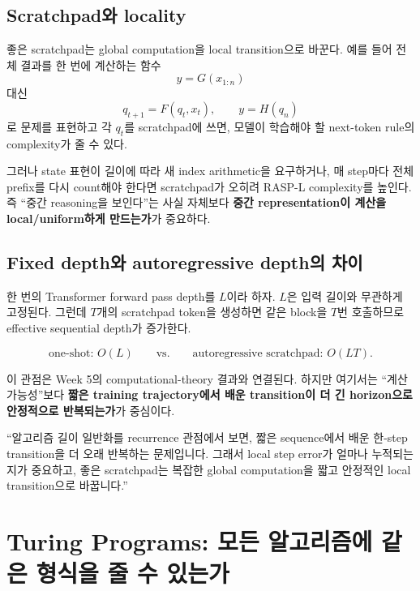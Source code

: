 \documentclass[11pt,a4paper,oneside,openany]{memoir}
\theoremstyle{definition}
\begin{document}
\section{Scratchpad와 locality}

좋은 scratchpad는 global computation을 local transition으로 바꾼다.
예를 들어 전체 결과를 한 번에 계산하는 함수
\[
y=G(x_{1:n})
\]
대신
\[
q_{t+1}=F(q_t,x_t),\qquad y=H(q_n)
\]
로 문제를 표현하고 각 $q_t$를 scratchpad에 쓰면, 모델이 학습해야 할 next-token rule의 complexity가 줄 수 있다.

그러나 state 표현이 길이에 따라 새 index arithmetic을 요구하거나, 매 step마다 전체 prefix를 다시 count해야 한다면 scratchpad가 오히려 RASP-L complexity를 높인다.
즉 ``중간 reasoning을 보인다''는 사실 자체보다 \textbf{중간 representation이 계산을 local/uniform하게 만드는가}가 중요하다.

\section{Fixed depth와 autoregressive depth의 차이}

한 번의 Transformer forward pass depth를 $L$이라 하자. $L$은 입력 길이와 무관하게 고정된다.
그런데 $T$개의 scratchpad token을 생성하면 같은 block을 $T$번 호출하므로 effective sequential depth가 증가한다.

\[
\text{one-shot: }O(L)
\qquad\text{vs.}\qquad
\text{autoregressive scratchpad: }O(LT).
\]

이 관점은 Week 5의 computational-theory 결과와 연결된다.
하지만 여기서는 ``계산 가능성''보다 \textbf{짧은 training trajectory에서 배운 transition이 더 긴 horizon으로 안정적으로 반복되는가}가 중심이다.

\begin{presentbox}
``알고리즘 길이 일반화를 recurrence 관점에서 보면, 짧은 sequence에서 배운 한-step transition을 더 오래 반복하는 문제입니다. 그래서 local step error가 얼마나 누적되는지가 중요하고, 좋은 scratchpad는 복잡한 global computation을 짧고 안정적인 local transition으로 바꿉니다.''
\end{presentbox}

\chapter{Turing Programs: 모든 알고리즘에 같은 형식을 줄 수 있는가}
\end{document}

